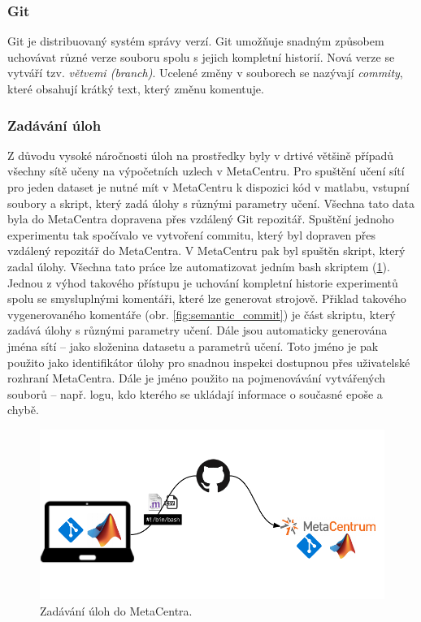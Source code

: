 \documentclass[thesis=M,czech]{FITthesis}[2012/06/26]
\begin{document}
\subsubsection*{Git}
Git je distribuovaný systém správy verzí. Git umožňuje snadným způsobem uchovávat různé verze souboru spolu s jejich kompletní historií. Nová verze se vytváří tzv. \textit{větvemi (branch)}. Ucelené změny v souborech se nazývají \textit{commity}, které  obsahují krátký text, který změnu komentuje.


\subsubsection*{Zadávání úloh}
Z důvodu vysoké náročnosti úloh na prostředky byly v drtivé většině případů všechny sítě učeny na výpočetních uzlech v MetaCentru. Pro spuštění učení sítí pro jeden dataset je nutné mít v MetaCentru k dispozici kód v matlabu, vstupní soubory a skript, který zadá úlohy s různými parametry učení. Všechna tato data byla do MetaCentra dopravena přes vzdálený Git repozitář. Spuštění jednoho experimentu tak spočívalo ve vytvoření commitu, který byl dopraven přes vzdálený repozitář do MetaCentra. V MetaCentru pak byl spuštěn skript, který zadal úlohy. Všechna tato práce lze automatizovat jedním bash skriptem (\ref{fig:up}). 
Jednou z výhod takového přístupu je uchování kompletní historie experimentů spolu se smysluplnými komentáři, které lze generovat strojově. Přiklad takového vygenerovaného komentáře (obr. \ref{fig:semantic_commit}) je část skriptu, který zadává úlohy s různými parametry učení. Dále jsou automaticky generována jména sítí -- jako složenina datasetu a parametrů učení. Toto jméno je pak použito jako identifikátor úlohy pro snadnou inspekci dostupnou přes uživatelské rozhraní MetaCentra. Dále je jméno použito na pojmenovávání vytvářených souborů -- např. logu, kdo kterého se ukládají informace o současné epoše a chybě.

\begin{figure}[htbp]
\begin{center}
	\includegraphics[scale=0.9]{up.png}
\caption{Zadávání úloh do MetaCentra.}
\label{fig:up}
\end{center}
\end{figure}
\end{document}
